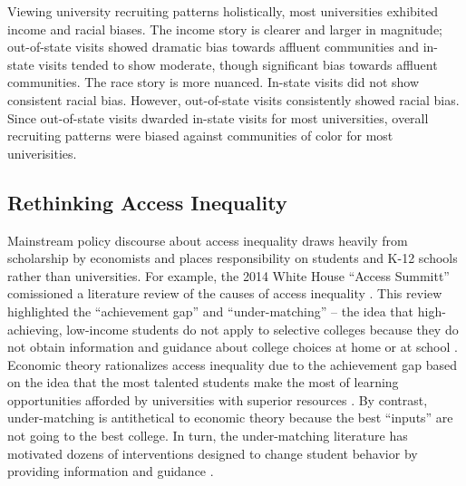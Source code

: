 \documentclass[twoside]{article}
\begin{document}
Viewing university recruiting patterns holistically, most universities exhibited income and racial biases. The income story is clearer and larger in magnitude; out-of-state visits showed dramatic bias towards affluent communities and in-state visits tended to show moderate, though significant bias towards affluent communities. The race story is more nuanced. In-state visits did not show consistent racial bias. However, out-of-state visits consistently showed racial bias. Since out-of-state visits dwarded in-state visits for most universities, overall recruiting patterns were biased against communities of color for most univerisities.

\subsection*{Rethinking Access Inequality}

Mainstream policy discourse about access inequality draws heavily from scholarship by economists and places responsibility on students and K-12 schools rather than universities. For example, the 2014 White House ``Access Summitt'' comissioned a literature review of the causes of access inequality \citep{RN4016}.  This review highlighted the ``achievement gap'' and ``under-matching'' -- the idea that high-achieving, low-income students do not apply to selective colleges because they do not obtain information and guidance about college choices at home or at school \citep{RN3699,RN3700}.  Economic theory rationalizes access inequality due to the achievement gap based on the idea that the most talented students make the most of learning opportunities afforded by universities with superior resources \citep{RN1549,RN2247,RN2402,RN1545}. By contrast, under-matching is antithetical to economic theory because the best ``inputs'' are not going to the best college. In turn, the under-matching literature has motivated dozens of interventions designed to change student behavior by providing information and guidance \citep[e.g., ][]{RN4352,RN4345,RN4351}.
\end{document}
